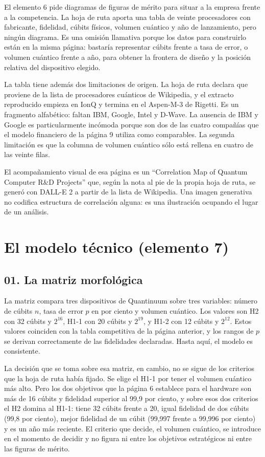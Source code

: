 \documentclass[11pt,letterpaper]{article}
\begin{document}
El elemento 6 pide diagramas de figuras de mérito para situar a la empresa
frente a la competencia. La hoja de ruta aporta una tabla de veinte
procesadores con fabricante, fidelidad, cúbits físicos, volumen cuántico y año
de lanzamiento, pero ningún diagrama. Es una omisión llamativa porque los datos
para construirlo están en la misma página: bastaría representar cúbits frente a
tasa de error, o volumen cuántico frente a año, para obtener la frontera de
diseño y la posición relativa del dispositivo elegido.

La tabla tiene además dos limitaciones de origen. La hoja de ruta declara que
proviene de la lista de procesadores cuánticos de Wikipedia, y el extracto
reproducido empieza en IonQ y termina en el Aspen-M-3 de Rigetti. Es un
fragmento alfabético: faltan IBM, Google, Intel y D-Wave. La ausencia de IBM y
Google es particularmente incómoda porque son dos de las cuatro compañías que
el modelo financiero de la página 9 utiliza como comparables. La segunda
limitación es que la columna de volumen cuántico sólo está rellena en cuatro de
las veinte filas.

El acompañamiento visual de esa página es un \enquote{Correlation Map of
Quantum Computer R\&D Projects} que, según la nota al pie de la propia hoja de
ruta, se generó con DALL-E 2 a partir de la lista de Wikipedia. Una imagen
generativa no codifica estructura de correlación alguna: es una ilustración
ocupando el lugar de un análisis.

\section{El modelo técnico (elemento 7)}

\subsection*{01. La matriz morfológica}

La matriz compara tres dispositivos de Quantinuum sobre tres variables: número
de cúbits $n$, tasa de error $p$ en por ciento y volumen cuántico. Los valores
son H2 con 32 cúbits y $2^{16}$, H1-1 con 20 cúbits y $2^{19}$, y H1-2 con 12
cúbits y $2^{12}$. Estos valores coinciden con la tabla competitiva de la
página anterior, y los rangos de $p$ se derivan correctamente de las
fidelidades declaradas. Hasta aquí, el modelo es consistente.

La decisión que se toma sobre esa matriz, en cambio, no se sigue de los
criterios que la hoja de ruta había fijado. Se elige el H1-1 por tener el
volumen cuántico más alto. Pero los dos objetivos que la página 6 establece
para el hardware son más de 16 cúbits y fidelidad superior al 99,9 por ciento,
y sobre esos dos criterios el H2 domina al H1-1: tiene 32 cúbits frente a 20,
igual fidelidad de dos cúbits (99,8 por ciento), mejor fidelidad de un cúbit
(99,997 frente a 99,996 por ciento) y es un año más reciente. El criterio que
decide, el volumen cuántico, se introduce en el momento de decidir y no figura
ni entre los objetivos estratégicos ni entre las figuras de mérito.
\end{document}
